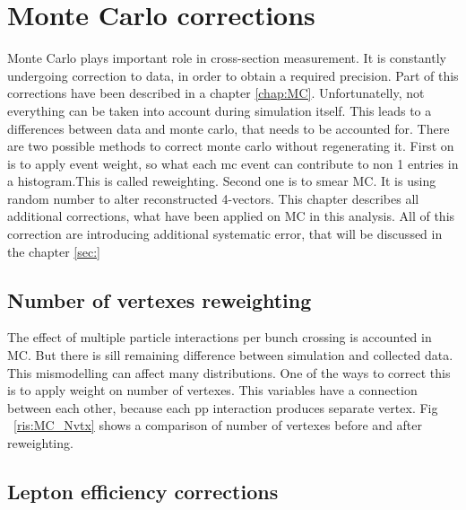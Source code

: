 \chapter{Monte Carlo corrections}
Monte Carlo plays important role in cross-section measurement. It is constantly undergoing correction to data, in order to obtain a required precision. Part of this corrections have been described in a chapter \ref{chap:MC}. Unfortunatelly,  not everything can be taken into account during simulation itself. This leads to a differences between data and monte carlo, that needs to be accounted for. There are two possible methods to correct monte carlo without regenerating it. First on is to apply event weight, so what each mc event can contribute to non 1 entries in a histogram.This is called reweighting. Second one is to smear MC. It is using random number to alter reconstructed 4-vectors. 
This chapter describes all additional corrections, what have been applied on MC in this analysis. All of this correction are introducing additional systematic error, that will be discussed in the chapter \ref{sec:}
\section{Number of vertexes reweighting}
The effect of multiple particle interactions per bunch crossing is accounted in MC. But there is sill remaining difference between simulation and collected data. This mismodelling can affect many distributions. One of the ways to correct this is to apply weight on number of vertexes. This variables have a connection between each other, because each pp interaction produces separate vertex. Fig ~\ref{ris:MC_Nvtx} shows a comparison of number of vertexes before and after reweighting.
\section{Lepton efficiency corrections}

